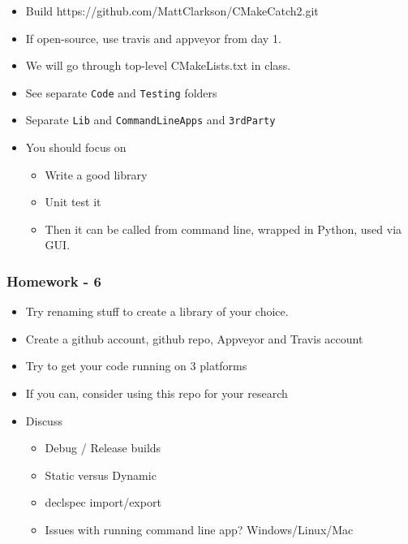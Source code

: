 \begin{itemize}
\tightlist
\item
  Build https://github.com/MattClarkson/CMakeCatch2.git
\item
  If open-source, use travis and appveyor from day 1.
\item
  We will go through top-level CMakeLists.txt in class.
\item
  See separate \texttt{Code} and \texttt{Testing} folders
\item
  Separate \texttt{Lib} and \texttt{CommandLineApps} and
  \texttt{3rdParty}
\item
  You should focus on

  \begin{itemize}
  \tightlist
  \item
    Write a good library
  \item
    Unit test it
  \item
    Then it can be called from command line, wrapped in Python, used via
    GUI.
  \end{itemize}
\end{itemize}

\hypertarget{homework---6}{%
\subsubsection{Homework - 6}\label{homework---6}}

\begin{itemize}
\tightlist
\item
  Try renaming stuff to create a library of your choice.
\item
  Create a github account, github repo, Appveyor and Travis account
\item
  Try to get your code running on 3 platforms
\item
  If you can, consider using this repo for your research
\item
  Discuss

  \begin{itemize}
  \tightlist
  \item
    Debug / Release builds
  \item
    Static versus Dynamic
  \item
    declspec import/export
  \item
    Issues with running command line app? Windows/Linux/Mac
  \end{itemize}
\end{itemize}

